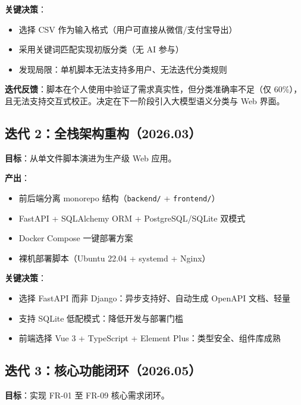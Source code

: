 \textbf{关键决策}：
\begin{itemize}
  \item 选择 CSV 作为输入格式（用户可直接从微信/支付宝导出）
  \item 采用关键词匹配实现初版分类（无 AI 参与）
  \item 发现局限：单机脚本无法支持多用户、无法迭代分类规则
\end{itemize}

\textbf{迭代反馈}：脚本在个人使用中验证了需求真实性，但分类准确率不足（仅 60\%），且无法支持交互式校正。决定在下一阶段引入大模型语义分类与 Web 界面。

\subsection{迭代 2：全栈架构重构（2026.03）}

\textbf{目标}：从单文件脚本演进为生产级 Web 应用。

\textbf{产出}：
\begin{itemize}
  \item 前后端分离 monorepo 结构（\texttt{backend/} + \texttt{frontend/}）
  \item FastAPI + SQLAlchemy ORM + PostgreSQL/SQLite 双模式
  \item Docker Compose 一键部署方案
  \item 裸机部署脚本（Ubuntu 22.04 + systemd + Nginx）
\end{itemize}

\textbf{关键决策}：
\begin{itemize}
  \item 选择 FastAPI 而非 Django：异步支持好、自动生成 OpenAPI 文档、轻量
  \item 支持 SQLite 低配模式：降低开发与部署门槛
  \item 前端选择 Vue 3 + TypeScript + Element Plus：类型安全、组件库成熟
\end{itemize}

\subsection{迭代 3：核心功能闭环（2026.05）}

\textbf{目标}：实现 FR-01 至 FR-09 核心需求闭环。

